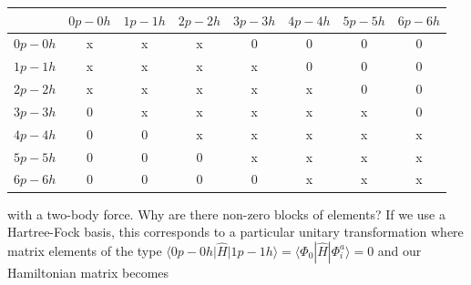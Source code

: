 \begin{table}
\begin{center}
\begin{tabular}{cccccccc}
\hline
\multicolumn{1}{c}{  } & \multicolumn{1}{c}{ $0p-0h$ } & \multicolumn{1}{c}{ $1p-1h$ } & \multicolumn{1}{c}{ $2p-2h$ } & \multicolumn{1}{c}{ $3p-3h$ } & \multicolumn{1}{c}{ $4p-4h$ } & \multicolumn{1}{c}{ $5p-5h$ } & \multicolumn{1}{c}{ $6p-6h$ } \\
\hline
$0p-0h$ & x       & x       & x       & 0       & 0       & 0       & 0       \\
$1p-1h$ & x       & x       & x       & x       & 0       & 0       & 0       \\
$2p-2h$ & x       & x       & x       & x       & x       & 0       & 0       \\
$3p-3h$ & 0       & x       & x       & x       & x       & x       & 0       \\
$4p-4h$ & 0       & 0       & x       & x       & x       & x       & x       \\
$5p-5h$ & 0       & 0       & 0       & x       & x       & x       & x       \\
$6p-6h$ & 0       & 0       & 0       & 0       & x       & x       & x       \\
\hline
\end{tabular}
\end{center}
\end{table}
with a two-body force. Why are there non-zero blocks of elements? 
If we use a Hartree-Fock basis, this corresponds to a particular unitary transformation where matrix elements of the type $\langle 0p-0h \vert \hat{H} \vert 1p-1h\rangle =\langle \Phi_0 | \hat{H}|\Phi_{i}^{a}\rangle=0$ and our Hamiltonian matrix becomes 

